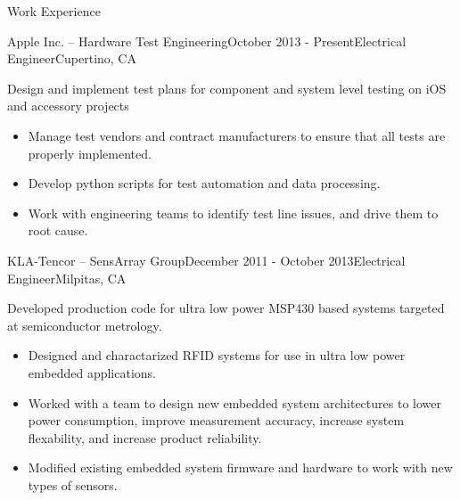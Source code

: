 \documentclass{resume} %
\begin{document}
\begin{rSection}{Work Experience}
\vspace{-0.5em}
\begin{rSubsection}{Apple Inc. -- Hardware Test Engineering}{October 2013 - Present}{Electrical Engineer}{Cupertino, CA}

\item Design and implement test plans for component and system level testing on iOS and accessory projects
\begin{itemize}
\itemsep -0.5em \vspace{-0.5em}
\renewcommand{\labelitemi}{-}
\item Manage test vendors and contract manufacturers to ensure that all tests are properly implemented.
\item Develop python scripts for test automation and data processing.
\item Work with engineering teams to identify test line issues, and drive them to root cause.
\end{itemize}
\end{rSubsection}


\begin{rSubsection}{KLA-Tencor -- SensArray Group}{December 2011 - October 2013}{Electrical Engineer}{Milpitas, CA}
\item Developed production code for ultra low power MSP430 based systems targeted at semiconductor metrology.
\begin{itemize}
\itemsep -0.5em \vspace{-0.5em}
\renewcommand{\labelitemi}{-}
\item Designed and charactarized RFID systems for use in ultra low power embedded applications.
\item Worked with a team to design new embedded system architectures to lower power consumption, improve measurement accuracy, increase system flexability, and increase product reliability.
\item Modified existing embedded system firmware and hardware to work with new types of sensors.
\end{itemize}


\end{rSubsection}
\end{rSection}
\end{document}
